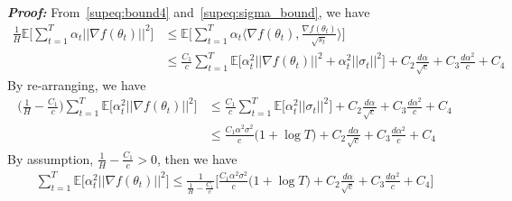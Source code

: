 \documentclass{article}
\begin{document}
\textbf{ \textit{Proof: }}
From~\eqref{supeq:bound4} and~\eqref{supeq:sigma_bound}, we have
\begin{align}
\label{supeq:bound7}
\frac{1}{H} \mathbb{E}\Big[ \sum_{t=1}^T \alpha_t \Big \vert \Big \vert \nabla f(\theta_t ) \Big \vert \Big \vert^2 \Big] &\leq \mathbb{E} \Big[ \sum_{t=1}^T \alpha_t \langle \nabla f(\theta_t ), \frac{\nabla f(\theta_t )}{\sqrt{s_t}} \rangle \Big] \nonumber \\
& \leq \frac{C_1}{c} \sum_{t=1}^T \mathbb{E} \Big[ \alpha_t^2 \Big \vert \Big \vert \nabla f(\theta_t ) \Big \vert \Big \vert^2 + \alpha_t ^2 \Big \vert \Big \vert \sigma_t \Big \vert \Big \vert^2 \Big] + C_2 \frac{d \alpha}{\sqrt{c}} + C_3 \frac{d \alpha^2}{c} + C_4
\end{align}
By re-arranging, we have
\begin{align}
\label{supeq:bound8}
\big( \frac{1}{H} - \frac{C_1}{c} \big) \sum_{t=1}^T \mathbb{E} \Big[ \alpha_t^2 \Big \vert \Big \vert \nabla f(\theta_t ) \Big \vert \Big \vert^2 \Big] 
&\leq \frac{C_1}{c} \sum_{t=1}^T \mathbb{E} \Big[ \alpha_t^2 \Big \vert \Big \vert \sigma_t \Big \vert \Big \vert^2 \Big] + C_2 \frac{d \alpha}{\sqrt{c}} + C_3 \frac{d \alpha^2}{c} + C_4 \nonumber \\
&\leq \frac{C_1 \alpha^2 \sigma^2}{c} \big(1+\log T \big) + C_2 \frac{d \alpha}{\sqrt{c}} + C_3 \frac{d \alpha^2}{c} + C_4
\end{align}
By assumption, $\frac{1}{H} - \frac{C_1}{c} > 0$, then we have
\begin{align}
\label{supeq:bound9}
\sum_{t=1}^T \mathbb{E} \Big[ \alpha_t^2 \Big \vert \Big \vert \nabla f(\theta_t ) \Big \vert \Big \vert^2 \Big] \leq \frac{1}{\frac{1}{H} - \frac{C_1}{c}} \Bigg[ \frac{C_1 \alpha^2 \sigma^2}{c} \big(1+\log T \big) + C_2 \frac{d \alpha}{\sqrt{c}} + C_3 \frac{d \alpha^2}{c} + C_4 \Bigg]
\end{align} \hfill \qedsymbol
\end{document}
